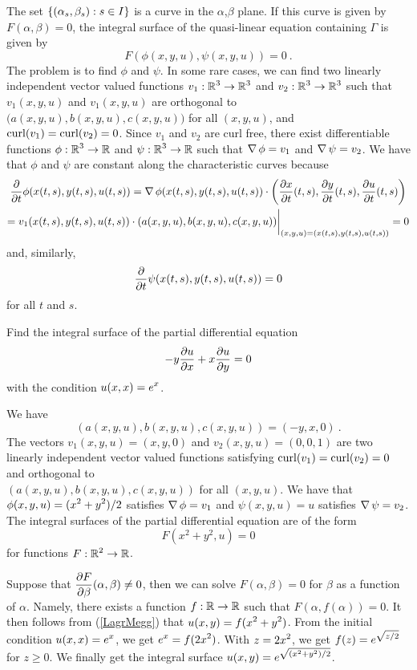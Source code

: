 The set $\DS \left\{ (\alpha_s,\beta_s) : s \in I \right\}$
is a curve in the $\alpha$,$\beta$ plane.  If this curve is given by
$F(\alpha,\beta)=0$, the integral surface of the quasi-linear equation
containing $\Gamma$ is given by
\[
F(\phi(x,y,u), \psi(x,y,u)) = 0 \ .
\]
The problem is to find $\phi$ and $\psi$.  In some rare cases, we can
find two linearly independent vector valued functions
$\DS v_1:\RR^3\rightarrow \RR^3$ and
$\DS v_2:\RR^3\rightarrow \RR^3$ such that
$v_1(x,y,u)$ and $v_1(x,y,u)$ are orthogonal to
$\big(a(x,y,u),b(x,y,u),c(x,y,u)\big)$ for all $(x,y,u)$, and
$\curL(v_1) = \curL(v_2)=0$.  Since $v_1$ and $v_2$ are curl free,
there exist differentiable functions
$\DS \phi:\RR^3\rightarrow \RR$ and
$\DS \psi:\RR^3\rightarrow \RR$ such that $\graD \phi = v_1$ and
$\graD \psi = v_2$.  We have that $\phi$ and $\psi$ are constant along
the characteristic curves because
\begin{multline*}
\pdfdx{ \phi(x(t,s),y(t,s),u(t,s)) }{t}
= \graD \phi(x(t,s),y(t,s),u(t,s)) \cdot \left(\pdydx{x}{t}(t,s),
\pdydx{y}{t}(t,s), \pdydx{u}{t}(t,s) \right) \\
= v_1(x(t,s),y(t,s),u(t,s)) \cdot
(a(x,y,u),b(x,y,u),c(x,y,u))\bigg|_{(x,y,u)=(x(t,s),y(t,s),u(t,s))} = 0
\end{multline*}
and, similarly,
\[
\pdfdx{ \psi(x(t,s),y(t,s),u(t,s)) }{t} = 0
\]
for all $t$ and $s$.

\begin{egg}
Find the integral surface of the partial differential equation
\[
-y \pdydx{u}{x} + x \pdydx{u}{y} = 0
\]
with the condition $\DS u(x,x)=e^x$.

We have
\[
\left(a(x,y,u),b(x,y,u),c(x,y,u)\right) = (-y,x,0) \ .
\]
The vectors $v_1(x,y,u)=(x,y,0)$ and $v_2(x,y,u)=(0,0,1)$ are two
linearly independent vector valued functions satisfying
$\curL(v_1) = \curL(v_2) = 0$ and orthogonal to\\
$(a(x,y,u),b(x,y,u),c(x,y,u))$ for all $(x,y,u)$.
We have that $\DS \phi(x,y,u)=(x^2+y^2)/2$
satisfies $\graD \phi = v_1$ and $\psi(x,y,u)=u$ satisfies
$\graD \psi = v_2$.  The integral surfaces of the partial differential
equation are of the form
\begin{equation} \label{LagrMegg}
F(x^2+y^2, u) = 0
\end{equation}
for functions $\DS F:\RR^2 \rightarrow \RR$.  

Suppose that $\DS \pdydx{F}{\beta}(\alpha,\beta) \neq 0$,
then we can solve $F(\alpha,\beta)=0$ for $\beta$ as a function of
$\alpha$.  Namely, there exists a function $f:\RR\rightarrow \RR$
such that $F(\alpha,f(\alpha))=0$.  It then follows from (\ref{LagrMegg})
that $\DS u(x,y) =f(x^2+y^2)$.  From the initial condition
$\DS u(x,x)= e^x$, we
get $\DS e^x = f(2x^2)$.  With $\DS z = 2x^2$, we get
$\DS f(z) = e^{\sqrt{z/2}}$ for $z \geq 0$. 
We finally get the integral surface
$\DS u(x,y) = e^{\sqrt{(x^2+y^2)/2}}$.
\end{egg}

